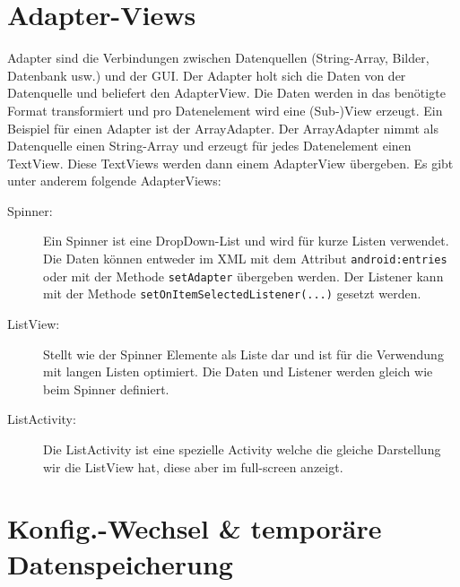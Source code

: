 \section{Adapter-Views}

Adapter sind die Verbindungen zwischen Datenquellen (String-Array, Bilder, Datenbank usw.) und der GUI. Der Adapter holt sich die Daten von der Datenquelle und beliefert den AdapterView. Die Daten werden in das benötigte Format transformiert und pro Datenelement wird eine (Sub-)View erzeugt. Ein Beispiel für einen Adapter ist der ArrayAdapter. Der ArrayAdapter nimmt als Datenquelle einen String-Array und erzeugt für jedes Datenelement einen TextView. Diese TextViews werden dann einem AdapterView übergeben.
Es gibt unter anderem folgende AdapterViews:
\begin{description}
	\item[Spinner:] Ein Spinner ist eine DropDown-List und wird für kurze Listen verwendet. Die Daten können entweder im XML mit dem Attribut \texttt{android:entries} oder mit der Methode \texttt{setAdapter} übergeben werden. Der Listener kann mit der Methode \texttt{setOnItemSelectedListener(...)} gesetzt werden.
	\item[ListView:] Stellt wie der Spinner Elemente als Liste dar und ist für die Verwendung mit langen Listen optimiert. Die Daten und Listener werden gleich wie beim Spinner definiert.
	\item[ListActivity:] Die ListActivity ist eine spezielle Activity welche die gleiche Darstellung wir die ListView hat, diese aber im full-screen anzeigt.
\end{description}

\section{Konfig.-Wechsel \& temporäre Datenspeicherung}

